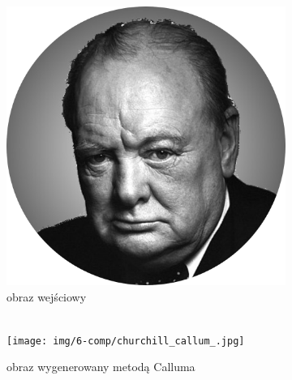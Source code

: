     	\begin{figure}[H] 
        \centering
        \begin{subfigure}{0.24\textwidth}
            \centering
            \includegraphics[width = \textwidth]{img/6-comp/churchill_original_c10_inv0.png}
            \caption{obraz wejściowy\\\hphantom{ }\\\hphantom{ }}
            \label{comp-comp-churchill-a}
        \end{subfigure}
        \begin{subfigure}{0.24\textwidth}
            \centering
            \texttt{[image: img/6-comp/churchill\_callum\_.jpg]}
            \caption{obraz wygenerowany metodą Calluma}
            \label{comp-comp-churchill-b}
        \end{subfigure}
        \begin{subfigure}{0.24\textwidth}
            \centering

\end{subfigure}
\end{figure}
